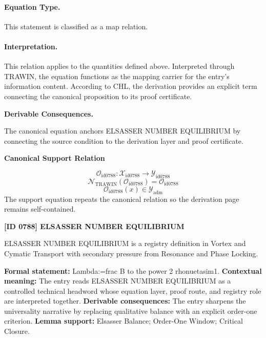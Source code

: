 \paragraph{Equation Type.}
This statement is classified as a map relation.

\paragraph{Interpretation.}
This relation applies to the quantities defined above. Interpreted through TRAWIN, the equation functions as the mapping carrier for the entry’s information content. According to CHL, the derivation provides an explicit term connecting the canonical proposition to its proof certificate.

\par\vspace{0.35em}
\noindent\textbf{Derivable Consequences.}\quad
\begingroup
\footnotesize
\raggedright
The canonical equation anchors ELSASSER NUMBER EQUILIBRIUM by connecting the source condition to the derivation layer and proof certificate.
\par\endgroup

\noindent\textbf{Canonical Support Relation}\par
\[
\mathcal{O}_{\mathrm{id0788}}:\mathcal{X}_{\mathrm{id0788}}\longrightarrow\mathcal{Y}_{\mathrm{id0788}}
\]
\[
\mathcal{N}_{\mathrm{TRAWIN}}(\mathcal{O}_{\mathrm{id0788}})=\mathcal{O}_{\mathrm{id0788}}
\]
\[
\mathcal{O}_{\mathrm{id0788}}(x)\in\mathcal{Y}_{\mathrm{adm}}
\]
\noindent The support equation repeats the canonical relation so the derivation page remains self-contained.\par

\clearpage
\noindent\textbf{[ID 0788] ELSASSER NUMBER EQUILIBRIUM}\par
\vspace{0.35em}
\begingroup\small
{}
ELSASSER NUMBER EQUILIBRIUM is a registry definition in Vortex and Cymatic Transport with secondary pressure from Resonance and Phase Locking.

\begingroup\footnotesize\setlength{\emergencystretch}{3em}\sloppy
\textbf{Formal statement:} Lambda:=frac B to the power 2 rhonuetasim1. \textbf{Contextual meaning:} The entry reads ELSASSER NUMBER EQUILIBRIUM as a controlled technical headword whose equation layer, proof route, and registry role are interpreted together. \textbf{Derivable consequences:} The entry sharpens the universality narrative by replacing qualitative balance with an explicit order-one criterion. \textbf{Lemma support:} Elsasser Balance; Order-One Window; Critical Closure.\par
\endgroup

